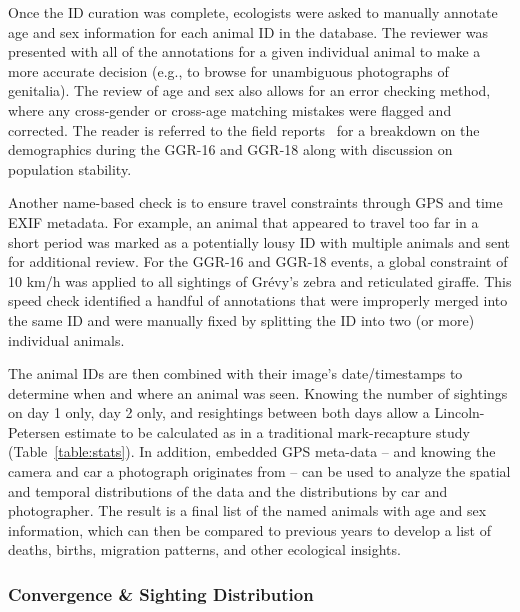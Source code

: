 Once the ID curation was complete, ecologists were asked to manually annotate age and sex information for each animal ID in the database.  The reviewer was presented with all of the annotations for a given individual animal to make a more accurate decision (e.g., to browse for unambiguous photographs of genitalia).  The review of age and sex also allows for an error checking method, where any cross-gender or cross-age matching mistakes were flagged and corrected.  The reader is referred to the field reports~\cite{berger-wolf_great_2016,rubenstein_state_2018,rubenstein_great_2015} for a breakdown on the demographics during the GGR-16 and GGR-18 along with discussion on population stability.

Another name-based check is to ensure travel constraints through GPS and time EXIF metadata.  For example, an animal that appeared to travel too far in a short period was marked as a potentially lousy ID with multiple animals and sent for additional review.  For the GGR-16 and GGR-18 events, a global constraint of 10 km/h was applied to all sightings of Gr\'evy's zebra and reticulated giraffe.  This speed check identified a handful of annotations that were improperly merged into the same ID and were manually fixed by splitting the ID into two (or more) individual animals.

The animal IDs are then combined with their image's date/timestamps to determine when and where an animal was seen.  Knowing the number of sightings on day 1 only, day 2 only, and resightings between both days allow a Lincoln-Petersen estimate to be calculated as in a traditional mark-recapture study (Table~\ref{table:stats}). In addition, embedded GPS meta-data -- and knowing the camera and car a photograph originates from -- can be used to analyze the spatial and temporal distributions of the data and the distributions by car and photographer.  The result is a final list of the named animals with age and sex information, which can then be compared to previous years to develop a list of deaths, births, migration patterns, and other ecological insights.

\subsubsection{Convergence \& Sighting Distribution}

